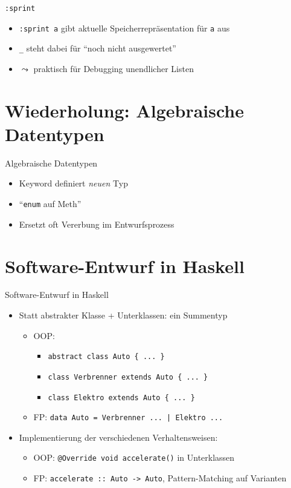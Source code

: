\documentclass{beamer}
\newcommand{\code}[1]{
	\begin{mdframed}
		
	\end{mdframed}
}
\begin{document}
\begin{frame}{\texttt{:sprint}}
	\code{code/ghci-sprint.output}

	\begin{itemize}
		\item \texttt{:sprint a} gibt aktuelle Speicherrepräsentation für \texttt{a} aus
		\item \texttt{\_} steht dabei für \enquote{noch nicht ausgewertet}
		\item $\leadsto$ praktisch für Debugging unendlicher Listen
	\end{itemize}
\end{frame}

\section{Wiederholung: Algebraische Datentypen}

\begin{frame}{Algebraische Datentypen}
	\code{demos/DataExamples.hs}

	\begin{itemize}
		\item Keyword  definiert \emph{neuen} Typ
		\item \enquote{\texttt{enum} auf Meth}
		\item Ersetzt oft Vererbung im Entwurfsprozess
	\end{itemize}
\end{frame}

\section{Software-Entwurf in Haskell}

\begin{frame}{Software-Entwurf in Haskell}
	\begin{itemize}
		\item Statt abstrakter Klasse + Unterklassen: ein Summentyp
		\begin{itemize}
			\item OOP: \pause
			\begin{itemize}
				\item \texttt{abstract class Auto \{ ... \}}
				\item \texttt{class Verbrenner extends Auto \{ ... \}}
				\item \texttt{class Elektro extends Auto \{ ... \}}
			\end{itemize}
			\item FP: \pause\texttt{data Auto = Verbrenner ... | Elektro ...}
		\end{itemize}
		\item Implementierung der verschiedenen Verhaltensweisen:
		\begin{itemize}
			\item OOP: \pause\texttt{@Override void accelerate()} in Unterklassen
			\item FP: \pause\texttt{accelerate :: Auto -> Auto}, Pattern-Matching auf Varianten
		\end{itemize}
	\end{itemize}
\end{frame}
\end{document}
